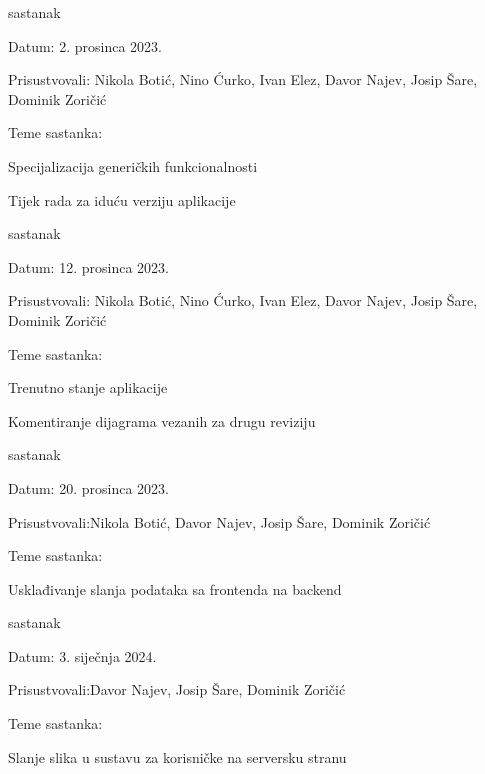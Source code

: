 \begin{packed_enum}
			\item  sastanak
			\item[] \begin{packed_item}
				\item Datum: 2. prosinca 2023.
				\item Prisustvovali: Nikola Botić, 
				Nino Ćurko, Ivan Elez,
				Davor Najev, Josip Šare,
				Dominik Zoričić
				\item Teme sastanka:
				\begin{packed_item}
					\item  Specijalizacija generičkih funkcionalnosti
					\item Tijek rada za iduću verziju aplikacije
				\end{packed_item}
			\end{packed_item}
			
			\item  sastanak
			\item[] \begin{packed_item}
				\item Datum: 12. prosinca 2023.
				\item Prisustvovali: Nikola Botić, 
				Nino Ćurko, Ivan Elez,
				Davor Najev, Josip Šare,
				Dominik Zoričić
				\item Teme sastanka:
				\begin{packed_item}
					\item  Trenutno stanje aplikacije
					\item Komentiranje dijagrama vezanih za drugu reviziju
				\end{packed_item}
			\end{packed_item}
			
			\item  sastanak
			\item[] \begin{packed_item}
				\item Datum: 20. prosinca 2023.
				\item Prisustvovali:Nikola Botić, Davor Najev, Josip Šare, Dominik Zoričić
				\item Teme sastanka:
				\begin{packed_item}
					\item  Usklađivanje slanja podataka sa frontenda na backend
				\end{packed_item}
			\end{packed_item}
			
			\item  sastanak
			\item[] \begin{packed_item}
				\item Datum: 3. siječnja 2024.
				\item Prisustvovali:Davor Najev, Josip Šare, Dominik Zoričić
				\item Teme sastanka:
				\begin{packed_item}
					\item  Slanje slika u sustavu za korisničke na serversku stranu
				\end{packed_item}
			\end{packed_item}
			

\end{packed_enum}
